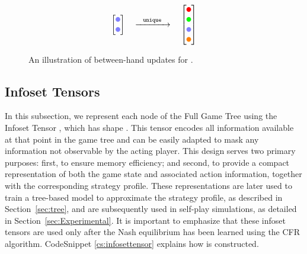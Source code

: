 \begin{figure}[h]
\[\begin{bmatrix}
\tikz\fill[fill=blue!50] (0,0) circle (0.1); \\ 
\tikz\fill[fill=blue!50] (0,0) circle (0.1);  \\
\end{bmatrix}
\quad
\xrightarrow{\hspace{0.25cm}\py{unique}\hspace{0.25cm}}
\quad
\begin{bmatrix}
\tikz\fill[red] (0,0) circle (0.1); \\ 
\tikz\fill[green] (0,0) circle (0.1);  \\ 
\tikz\fill[fill=blue!50] (0,0) circle (0.1);  \\ 
\tikz\fill[orange] (0,0) circle (0.1); \\ 
\end{bmatrix}
\]
  \caption{An illustration of between-hand updates for .}
  \label{fig01:bethand}
\end{figure}




\subsection{Infoset Tensors}\label{sec:infosettensor}
In this subsection, we represent each node of the Full Game Tree using the Infoset Tensor , which has shape \py{[56]}. This tensor encodes all information available at that point in the game tree and can be easily adapted to mask any information not observable by the acting player. This design serves two primary purposes: first, to ensure memory efficiency; and second, to provide a compact representation of both the game state and associated action information, together with the corresponding strategy profile. These representations are later used to train a tree-based model to approximate the strategy profile, as described in Section~\ref{sec:tree}, and are subsequently used in self-play simulations, as detailed in Section~\ref{sec:Experimental}. It is important to emphasize that these infoset tensors are used only after the Nash equilibrium has been learned using the CFR algorithm. CodeSnippet \ref{cs:infosettensor} explains how  is constructed. 

